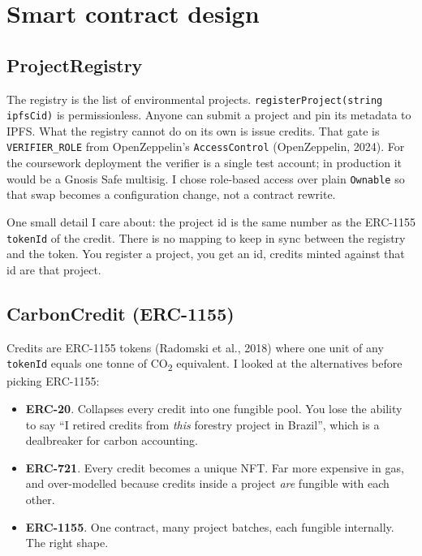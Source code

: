 \documentclass[11pt,a4paper]{article}
\begin{document}
\section{Smart contract design}

\subsection{ProjectRegistry}
The registry is the list of environmental projects.
\texttt{registerProject(string ipfsCid)} is permissionless. Anyone can
submit a project and pin its metadata to IPFS. What the registry cannot
do on its own is issue credits. That gate is \texttt{VERIFIER\_ROLE}
from OpenZeppelin's \texttt{AccessControl} (OpenZeppelin, 2024). For the
coursework deployment the verifier is a single test account; in
production it would be a Gnosis Safe multisig. I chose role-based
access over plain \texttt{Ownable} so that swap becomes a configuration
change, not a contract rewrite.

One small detail I care about: the project id is the same number as the
ERC-1155 \texttt{tokenId} of the credit. There is no mapping to keep in
sync between the registry and the token. You register a project, you
get an id, credits minted against that id are that project.

\subsection{CarbonCredit (ERC-1155)}
Credits are ERC-1155 tokens (Radomski et al., 2018) where one unit of
any \texttt{tokenId} equals one tonne of CO\textsubscript{2} equivalent.
I looked at the alternatives before picking ERC-1155:

\begin{itemize}[leftmargin=1.3em, itemsep=2pt]
    \item \textbf{ERC-20}. Collapses every credit into one fungible
    pool. You lose the ability to say ``I retired credits from
    \emph{this} forestry project in Brazil'', which is a dealbreaker for
    carbon accounting.
    \item \textbf{ERC-721}. Every credit becomes a unique NFT. Far more
    expensive in gas, and over-modelled because credits inside a
    project \emph{are} fungible with each other.
    \item \textbf{ERC-1155}. One contract, many project batches, each
    fungible internally. The right shape.
\end{itemize}
\end{document}
